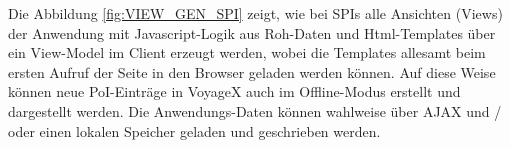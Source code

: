 Die Abbildung \ref{fig:VIEW_GEN_SPI} zeigt, wie bei SPIs alle Ansichten (Views) der Anwendung mit Javascript-Logik aus Roh-Daten und Html-Templates über ein View-Model im Client erzeugt werden, wobei die Templates allesamt beim ersten Aufruf der Seite in den Browser geladen werden können. Auf diese Weise können neue PoI-Einträge in VoyageX auch im Offline-Modus erstellt und dargestellt werden.
Die Anwendungs-Daten können wahlweise über AJAX und / oder einen lokalen Speicher geladen und geschrieben werden. 
	
